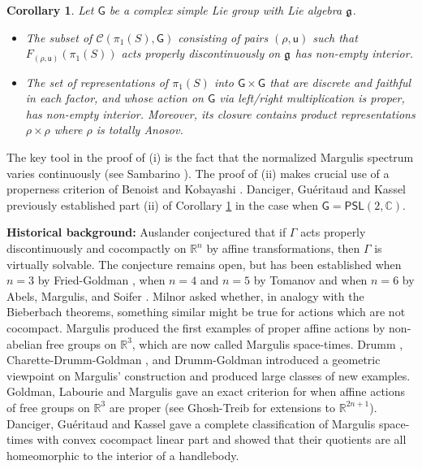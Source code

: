 \documentclass{amsart}
\theoremstyle{plain}
\newtheorem{corollary}[proposition]{Corollary}
\theoremstyle{definition}
\theoremstyle{remark}
\newcommand{\R}{\mathbb R}
\newcommand{\PSL}{\mathsf{PSL}}
\renewcommand{\sf}[1]{{\mathsf{#1}}}
\newcommand{\C}{\mathbb C}
\newcommand{\<}{\left <}
\renewcommand{\>}{\right >}
\newcommand{\co}{\sf u}
\renewcommand{\C}{\mathbb C}
\begin{document}
\begin{corollary}\label{complexgroups} Let $\sf G$ be a complex simple Lie group with Lie algebra $\frak g$.
\begin{itemize}
\item[i)] The subset of $\mathcal C(\pi_1(S),\sf G)$ consisting of pairs $(\rho,\co)$ such that $F_{(\rho,\co)}(\pi_1(S))$ acts properly discontinuously on 
$\frak g$ has non-empty interior.
\item[ii)] The set of representations of  $\pi_1(S)$ into $\sf G\times\sf G$ that are discrete and faithful in each factor, and whose action on 
$\sf G$ via left/right multiplication is proper, has non-empty interior.
Moreover,  its closure contains product representations $\rho\times\rho$ where $\rho$ is totally Anosov.
\end{itemize}
\end{corollary}



The key tool in the proof of (i)  is the fact that the normalized
Margulis spectrum varies continuously (see Sambarino \cite[Lemma 2.34]{sambarino}). 
The proof of (ii) makes crucial use of a properness
criterion of Benoist \cite{BenoistK-criterion} and Kobayashi \cite{BKobayashi-criterion}.
Danciger, Gu\'eritaud and Kassel \cite[Prop. 1.8]{DGK-aff} previously established part (ii) of Corollary \ref{complexgroups} in the case
when $\sf G=\PSL(2,\C)$.


\medskip\noindent
{\bf Historical background:}
Auslander \cite{auslander} conjectured that if $\Gamma$ acts properly discontinuously and cocompactly on $\R^n$ by affine transformations,
then $\Gamma$ is virtually solvable. The conjecture remains open, but has been established when $n=3$ by Fried-Goldman \cite{fried-goldman},
when $n=4 $ and $n=5$ by Tomanov \cite{tomanov} and when $n=6$  by  Abels, Margulis, and Soifer \cite{AMS}.
Milnor \cite{milnor} asked whether, in analogy with the Bieberbach theorems, something similar might be true for actions which are not cocompact.
Margulis \cite{Mar1,Mar2} produced the first examples of proper affine actions by non-abelian free groups on $\R^3$, which
are now called Margulis space-times.
Drumm \cite{Drumm}, Charette-Drumm-Goldman \cite{CDG-2gen},  and Drumm-Goldman \cite{DG-crooked} introduced a geometric viewpoint
on Margulis' construction and produced large classes of new examples. Goldman, Labourie and Margulis  \cite{GLM} gave 
an exact criterion for when affine actions of free groups on $\R^3$ are proper (see Ghosh-Treib \cite{ghosh-treib} for extensions to $\mathbb R^{2n+1}$).
Danciger, Gu\'eritaud and Kassel \cite{DGK1,DGK2}
gave a complete classification of Margulis space-times with convex cocompact linear part and showed that their quotients are all
homeomorphic to the interior of a handlebody. 
\end{document}
